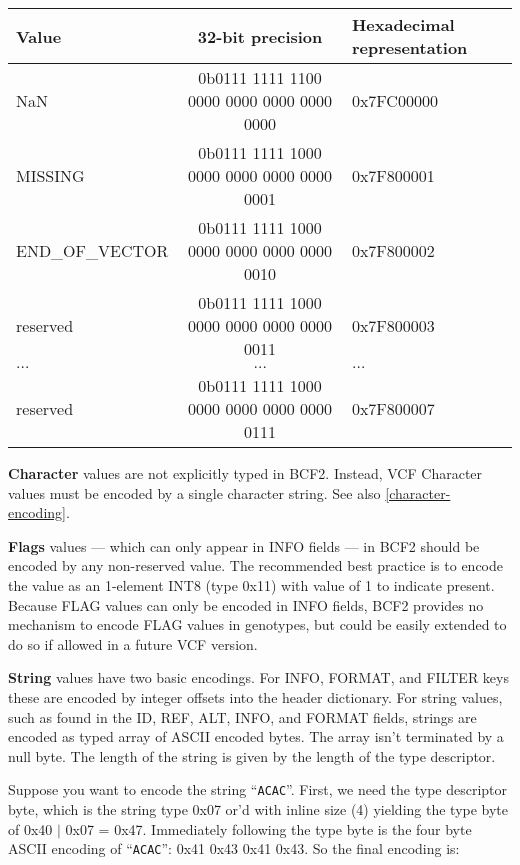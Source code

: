 \documentclass[8pt]{article}
\begin{document}
\vspace{0.1cm}
\begin{tabular}{| l | c | l |} \hline
\textbf{Value}   & \textbf{32-bit precision} & \textbf{Hexadecimal representation} \\ \hline
NaN	    & 0b0111 1111 1100 0000 0000 0000 0000 0000 & 0x7FC00000 \\ \hline
MISSING & 0b0111 1111 1000 0000 0000 0000 0000 0001 & 0x7F800001 \\ \hline
END\_OF\_VECTOR & 0b0111 1111 1000 0000 0000 0000 0000 0010 & 0x7F800002 \\ \hline
reserved & 0b0111 1111 1000 0000 0000 0000 0000 0011 & 0x7F800003 \\ \hline
$\ldots$ & $\ldots$ & $\ldots$ \\ \hline
reserved & 0b0111 1111 1000 0000 0000 0000 0000 0111 & 0x7F800007 \\ \hline
\end{tabular}

\vspace{0.3cm}
\textbf{Character} values are not explicitly typed in BCF2.
Instead, VCF Character values must be encoded by a single character string. See also \ref{character-encoding}.

\vspace{0.3cm}
\textbf{Flags} values --- which can only appear in INFO fields --- in BCF2 should be encoded by any non-reserved value.
The recommended best practice is to encode the value as an 1-element INT8 (type 0x11) with value of 1 to indicate present.
Because FLAG values can only be encoded in INFO fields, BCF2 provides no mechanism to encode FLAG values in genotypes, but could be easily extended to do so if allowed in a future VCF version.

\vspace{0.3cm}
\textbf{String} values have two basic encodings.
For INFO, FORMAT, and FILTER keys these are encoded by integer offsets into the header dictionary.
For string values, such as found in the ID, REF, ALT, INFO, and FORMAT fields, strings are encoded as typed array of ASCII encoded bytes.
The array isn't terminated by a null byte.
The length of the string is given by the length of the type descriptor.

Suppose you want to encode the string ``{\tt ACAC}''.
First, we need the type descriptor byte, which is the string type 0x07 or'd with inline size (4) yielding the type byte of 0x40 $|$ 0x07 = 0x47.
Immediately following the type byte is the four byte ASCII encoding of ``{\tt ACAC}'': 0x41 0x43 0x41 0x43.
So the final encoding is:
\end{document}
